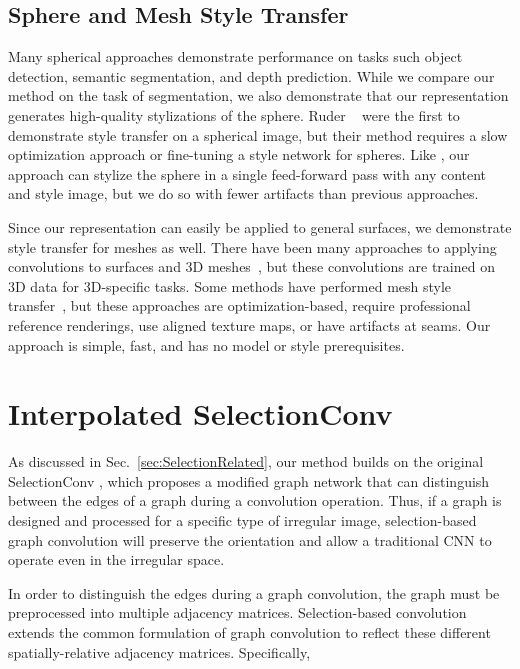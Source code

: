 \documentclass[10pt,twocolumn,letterpaper]{article}
\begin{document}
\subsection{Sphere and Mesh Style Transfer}

Many spherical approaches demonstrate performance on tasks such object detection, semantic segmentation, and depth prediction. While we compare our method on the task of segmentation, we also demonstrate that our representation generates high-quality stylizations of the sphere. Ruder \etal~\cite{Ruder2018} were the first to demonstrate style transfer on a spherical image, but their method requires a slow optimization approach or fine-tuning a style network for spheres. Like \cite{SelectionConv}, our approach can stylize the sphere in a single feed-forward pass with any content and style image, but we do so with fewer artifacts than previous approaches.

Since our representation can easily be applied to general surfaces, we demonstrate style transfer for meshes as well. There have been many approaches to applying convolutions to surfaces and 3D meshes~\cite{Haim2019,Hanocka2019,Lahav2020,Sinha2016,Wiersma2020}, but these convolutions are trained on 3D data for 3D-specific tasks. Some methods have performed mesh style transfer~\cite{StyLit,SelectionConv,StyBlit,yin2021}, but these approaches are optimization-based, require professional reference renderings, use aligned texture maps, or have artifacts at seams. Our approach is simple, fast, and has no model or style prerequisites.

\section{Interpolated SelectionConv} \label{sec:Interpolation}

As discussed in Sec.~\ref{sec:SelectionRelated}, our method builds on the original SelectionConv \cite{SelectionConv}, which proposes a modified graph network that can distinguish between the edges of a graph during a convolution operation. 
Thus, if a graph is designed and processed for a specific type of irregular image, selection-based graph convolution will preserve the orientation and allow a traditional CNN to operate even in the irregular space. 

In order to distinguish the edges during a graph convolution, the graph must be preprocessed into multiple adjacency matrices. Selection-based convolution extends the common formulation of graph convolution to reflect these different spatially-relative adjacency matrices. Specifically,
\end{document}
